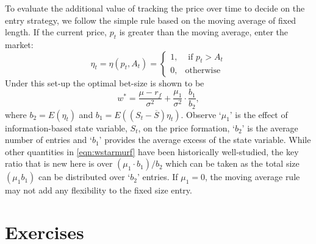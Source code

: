 To evaluate the additional value of tracking the price over time to decide on the entry strategy, we follow the simple rule based on the moving average of fixed length. If the current price, $p_t$ is greater than the moving average, enter the market:
	\begin{equation} \label{eqn:etatetapt}
	\eta_t= \eta(p_t,A_t)= \begin{cases}
	1, & \text{ if } p_t > A_t \\
	0, & \text{otherwise}
	\end{cases}
	\end{equation}
Under this set-up the optimal bet-size is shown to be
	\begin{equation} \label{eqn:wstarmurf}
	w^*= \dfrac{\mu - r_f}{\sigma^2} + \dfrac{\mu_1}{\sigma^2} \cdot \dfrac{b_1}{b_2},
	\end{equation}
where $b_2=E(\eta_t)$ and $b_1=E((S_t - \overline{S}) \eta_t)$. Observe `$\mu_1$' is the effect of information-based state variable, $S_t$, on the price formation, `$b_2$' is the average number of entries and `$b_1$' provides the average excess of the state variable. While other quantities in \eqref{eqn:wstarmurf} have been historically well-studied, the key ratio that is new here is over $(\mu_1 \cdot b_1)/b_2$ which can be taken as the total size $(\mu_1 b_1)$ can be distributed over `$b_2$' entries. If $\mu_1= 0$, the moving average rule may not add any flexibility to the fixed size entry. 



\section{Exercises}


